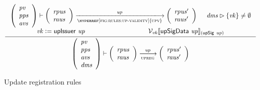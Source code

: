 \begin{figure}[htb]
  \begin{equation}
    \label{eq:rule:up-registration}
    \inference
    {
      {\left(
        \begin{array}{l}
          \var{pv}\\
          \var{pps}\\
          \var{avs}
        \end{array}
      \right)}
      \vdash
      {
        \left(
          \begin{array}{l}
            \var{rpus}\\
            \var{raus}\\
          \end{array}
        \right)
      }
      \trans{\hyperref[fig:rules:up-validity]{upv}}{\var{up}}
      {
        \left(
          \begin{array}{l}
            \var{rpus'}\\
            \var{raus'}\\
          \end{array}
        \right)
      }
      &
      \var{dms} \restrictrange \{\var{vk}\} \neq \emptyset\\
      \var{vk} \leteq \upIssuer{up} &
      \mathcal{V}_{\var{vk}}\serialised{\upSigData{up}}_{(\upSig{up})}
    }
    {
      {\left(
        \begin{array}{l}
          \var{pv}\\
          \var{pps}\\
          \var{avs}\\
          \var{dms}
        \end{array}
      \right)}
      \vdash
      {
        \left(
          \begin{array}{l}
            \var{rpus}\\
            \var{raus}
          \end{array}
        \right)
      }
      \trans{upreg}{\var{up}}
      {
        \left(
          \begin{array}{l}
            \var{rpus'}\\
            \var{raus'}
          \end{array}
        \right)
      }
    }
  \end{equation}
  \caption{Update registration rules}
  \label{fig:rules:up-registration}
\end{figure}

\clearpage

